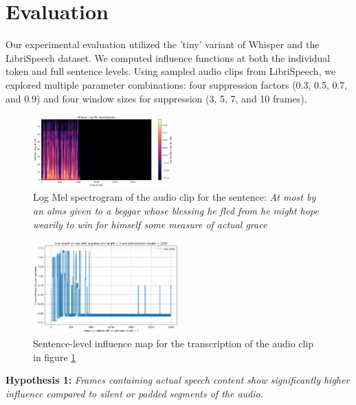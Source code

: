 \documentclass[../report.tex]{subfiles}
\begin{document}
    \section{Evaluation}
    \label{sec:evaluation}


    Our experimental evaluation utilized the 'tiny' variant of Whisper\cite{radford2023robust} and the LibriSpeech\cite{panayotov2015librispeech} dataset. We computed influence functions at both the individual token and full sentence levels. Using sampled audio clips from LibriSpeech, we explored multiple parameter combinations: four suppression factors (0.3, 0.5, 0.7, and 0.9) and four window sizes for suppression (3, 5, 7, and 10 frames).
    \begin{figure}[ht]
        \centering
        \includegraphics[width=0.48\textwidth]{figures/audio7.png}
        \caption{Log Mel spectrogram of the audio clip for the sentence: \protect\linebreak 
        \textit{At most by an alms given to a beggar whose blessing he fled from he might hope wearily to win for himself some measure of actual grace}}
        \label{fig:mel_spectrogram}
    \end{figure}
    \begin{figure}[ht]
        \centering
        \includegraphics[width=0.5\textwidth]{figures/sentence7_5_5.png}
        \caption{Sentence-level influence map for the transcription of the audio clip in figure \ref{fig:mel_spectrogram}}
        \label{fig:sentence_level_map}
    \end{figure}

    \textbf{Hypothesis 1:} \textit{Frames containing actual speech content show significantly higher influence compared to silent or padded segments of the audio.}
\end{document}
